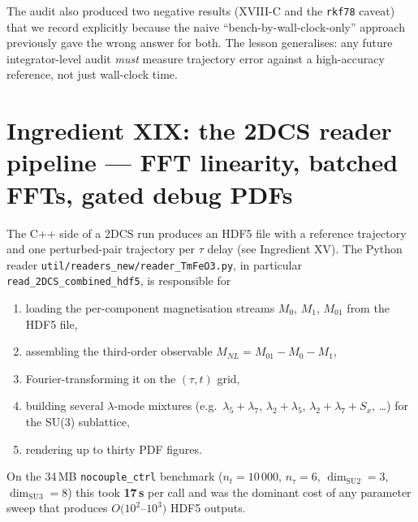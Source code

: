 \documentclass[11pt,letterpaper]{article}
\begin{document}
The audit also produced two negative results (XVIII-C and the
\texttt{rkf78} caveat) that we record explicitly because the
naive ``bench-by-wall-clock-only'' approach previously gave the
wrong answer for both.  The lesson generalises: any future
integrator-level audit \emph{must} measure trajectory error against
a high-accuracy reference, not just wall-clock time.

\section{Ingredient XIX: the 2DCS reader pipeline ---
         FFT linearity, batched FFTs, gated debug PDFs}

The C++ side of a 2DCS run produces an HDF5 file with a reference
trajectory and one perturbed-pair trajectory per $\tau$ delay
(see Ingredient XV).  The Python reader
\texttt{util/readers\_new/reader\_TmFeO3.py}, in particular
\texttt{read\_2DCS\_combined\_hdf5}, is responsible for
\begin{enumerate}[noitemsep,leftmargin=*]
  \item loading the per-component magnetisation streams
        $M_0$, $M_1$, $M_{01}$ from the HDF5 file,
  \item assembling the third-order observable
        $M_{NL}=M_{01}-M_0-M_1$,
  \item Fourier-transforming it on the $(\tau,t)$ grid,
  \item building several $\lambda$-mode mixtures (e.g.\
        $\lambda_5+\lambda_7$, $\lambda_2+\lambda_5$,
        $\lambda_2+\lambda_7+S_x$, \ldots) for the SU(3) sublattice,
  \item rendering up to thirty PDF figures.
\end{enumerate}
On the 34\,MB \texttt{nocouple\_ctrl} benchmark
($n_t=10\,000$, $n_\tau=6$, $\dim_{\mathrm{SU2}}=3$,
$\dim_{\mathrm{SU3}}=8$) this took \textbf{17\,s} per call
and was the dominant cost of any
parameter sweep that produces $O(10^2$--$10^3)$ HDF5 outputs.
\end{document}
